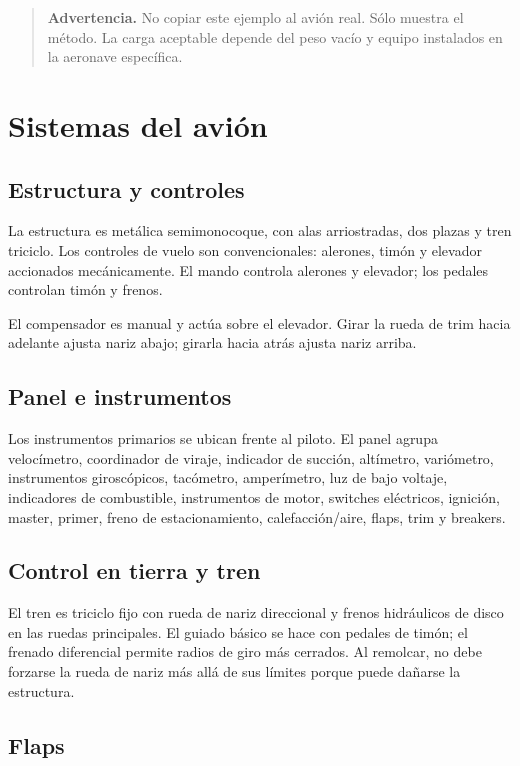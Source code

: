 \documentclass[11pt,oneside]{book}
\newcommand{\warning}[1]{\begin{quote}\small\textbf{Advertencia.} #1\end{quote}}
\begin{document}
\warning{No copiar este ejemplo al avión real. Sólo muestra el método. La carga aceptable depende del peso vacío y equipo instalados en la aeronave específica.}

\chapter{Sistemas del avión}

\section{Estructura y controles}

La estructura es metálica semimonocoque, con alas arriostradas, dos plazas y tren triciclo. Los controles de vuelo son convencionales: alerones, timón y elevador accionados mecánicamente. El mando controla alerones y elevador; los pedales controlan timón y frenos.

El compensador es manual y actúa sobre el elevador. Girar la rueda de trim hacia adelante ajusta nariz abajo; girarla hacia atrás ajusta nariz arriba.

\section{Panel e instrumentos}

Los instrumentos primarios se ubican frente al piloto. El panel agrupa velocímetro, coordinador de viraje, indicador de succión, altímetro, variómetro, instrumentos giroscópicos, tacómetro, amperímetro, luz de bajo voltaje, indicadores de combustible, instrumentos de motor, switches eléctricos, ignición, master, primer, freno de estacionamiento, calefacción/aire, flaps, trim y breakers.

\section{Control en tierra y tren}

El tren es triciclo fijo con rueda de nariz direccional y frenos hidráulicos de disco en las ruedas principales. El guiado básico se hace con pedales de timón; el frenado diferencial permite radios de giro más cerrados. Al remolcar, no debe forzarse la rueda de nariz más allá de sus límites porque puede dañarse la estructura.

\section{Flaps}
\end{document}
